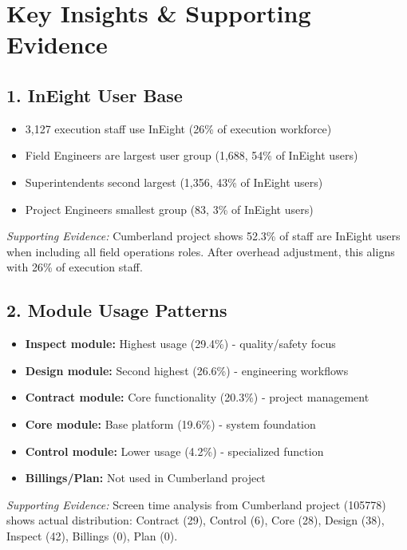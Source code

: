 \documentclass[11pt, letterpaper]{article}
\begin{document}
\newpage

\section*{Key Insights \& Supporting Evidence}

\subsection*{1. InEight User Base}
\begin{itemize}[nosep, leftmargin=2em]
    \item 3,127 execution staff use InEight (26\% of execution workforce)
    \item Field Engineers are largest user group (1,688, 54\% of InEight users)
    \item Superintendents second largest (1,356, 43\% of InEight users)
    \item Project Engineers smallest group (83, 3\% of InEight users)
\end{itemize}

\textit{Supporting Evidence:} Cumberland project shows 52.3\% of staff are InEight users when including all field operations roles. After overhead adjustment, this aligns with 26\% of execution staff.

\subsection*{2. Module Usage Patterns}
\begin{itemize}[nosep, leftmargin=2em]
    \item \textbf{Inspect module:} Highest usage (29.4\%) - quality/safety focus
    \item \textbf{Design module:} Second highest (26.6\%) - engineering workflows
    \item \textbf{Contract module:} Core functionality (20.3\%) - project management
    \item \textbf{Core module:} Base platform (19.6\%) - system foundation
    \item \textbf{Control module:} Lower usage (4.2\%) - specialized function
    \item \textbf{Billings/Plan:} Not used in Cumberland project
\end{itemize}

\textit{Supporting Evidence:} Screen time analysis from Cumberland project (105778) shows actual distribution: Contract (29), Control (6), Core (28), Design (38), Inspect (42), Billings (0), Plan (0).
\end{document}
